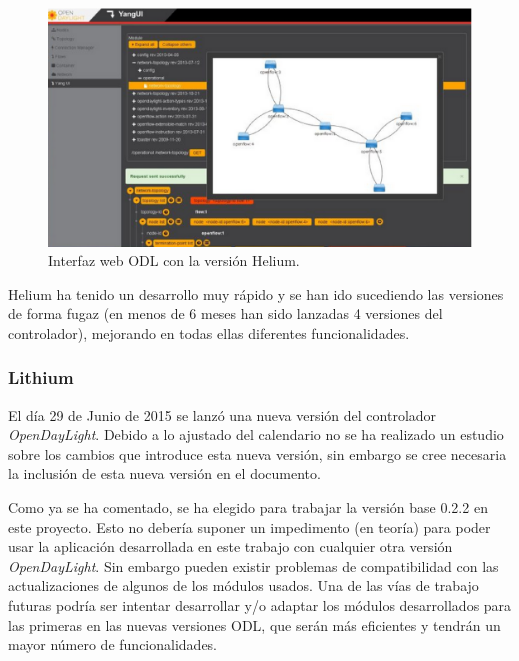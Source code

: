 \documentclass[a4paper,11pt]{book}
\begin{document}
\begin{figure}[tb]
\centering
\includegraphics[scale=0.65]{./figuras/dlux2}
\caption{Interfaz web \ac{ODL} con la versión Helium.}\label{dlux2}
\end{figure}

Helium ha tenido un desarrollo muy rápido y se han ido sucediendo las versiones de forma fugaz (en menos de 6 meses han sido lanzadas 4 versiones del controlador), mejorando en todas ellas diferentes funcionalidades.

\subsubsection{Lithium}

El día 29 de Junio de 2015 se lanzó una nueva versión del controlador \emph{OpenDayLight}. Debido a lo ajustado del calendario no se ha realizado un estudio sobre los cambios que introduce esta nueva versión, sin embargo se cree necesaria la inclusión de esta nueva versión en el documento.

Como ya se ha comentado, se ha elegido para trabajar la versión base 0.2.2 en este proyecto. Esto no debería suponer un impedimento (en teoría) para poder usar la aplicación desarrollada en este trabajo con cualquier otra versión \emph{OpenDayLight}. Sin embargo pueden existir problemas de compatibilidad con las actualizaciones de algunos de los módulos usados. Una de las vías de trabajo futuras podría ser intentar desarrollar y/o adaptar los módulos desarrollados para las primeras en las nuevas versiones \ac{ODL}, que serán más eficientes y tendrán un mayor número de funcionalidades.
\end{document}
